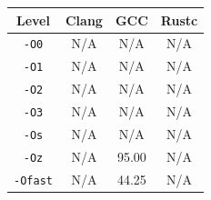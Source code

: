 \begin{tabular*}{\columnwidth}{@{\extracolsep\fill}cccc@{\extracolsep\fill}}
\toprule
\textbf{Level} & \textbf{Clang} & \textbf{GCC} & \textbf{Rustc} \\
\midrule
\texttt{-O0} & N/A & N/A & N/A \\
\texttt{-O1} & N/A & N/A & N/A \\
\texttt{-O2} & N/A & N/A & N/A \\
\texttt{-O3} & N/A & N/A & N/A \\
\texttt{-Os} & N/A & N/A & N/A \\
\texttt{-Oz} & N/A & 95.00 & N/A \\
\texttt{-Ofast} & N/A & 44.25 & N/A \\
\bottomrule
\end{tabular*}
